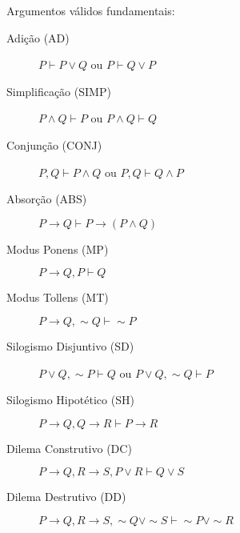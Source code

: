 \documentclass[12pt]{article}
\begin{document}
\newpage

Argumentos válidos fundamentais:
\begin{description}
\item[Adição (AD)] $P \vdash P \vee Q$ ou $P \vdash Q \vee P$
\item[Simplificação (SIMP)] $P \wedge Q \vdash P$ ou $P \wedge Q \vdash Q$
\item[Conjunção (CONJ)] $P, Q \vdash P \wedge Q$ ou $P, Q \vdash Q \wedge P$
\item[Absorção (ABS)] $P \rightarrow Q \vdash P \rightarrow (P \wedge Q)$
\item[Modus Ponens (MP)] $P \rightarrow Q, P \vdash Q$
\item[Modus Tollens (MT)] $P \rightarrow Q, \sim Q \vdash \sim P$
\item[Silogismo Disjuntivo (SD)] $P \vee Q, \sim P \vdash Q$ ou $P \vee Q, \sim Q \vdash P$
\item[Silogismo Hipotético (SH)] $P \rightarrow Q, Q\rightarrow R \vdash P\rightarrow R$
\item[Dilema Construtivo (DC)] $P\rightarrow Q, R\rightarrow S, P \vee R \vdash Q\vee S$
\item[Dilema Destrutivo (DD)] $P\rightarrow Q, R\rightarrow S, \sim Q\vee\sim S \vdash \sim P \vee\sim R$
\end{description}
\end{document}
